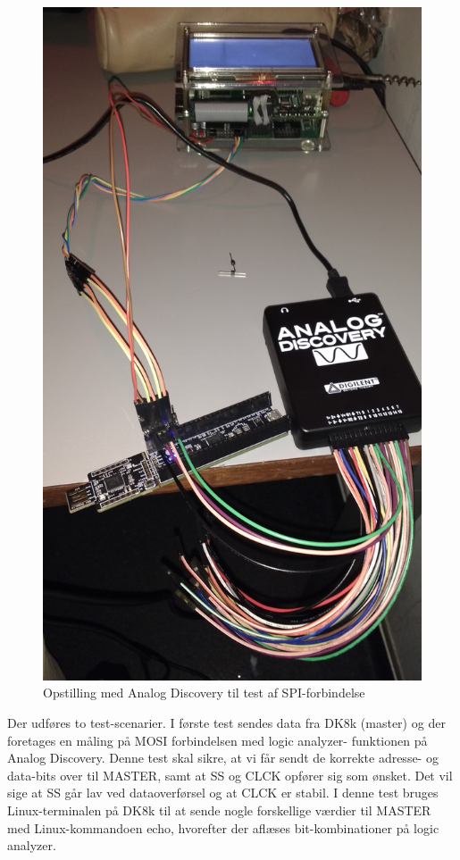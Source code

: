 \begin{figure}[H]
\includegraphics[scale=0.9]{Screenshots/Test_analog}
\caption{Opstilling med Analog Discovery til test af SPI-forbindelse} 
\end{figure}

Der udføres to test-scenarier. I første test sendes data fra DK8k (master) og der foretages en måling på MOSI forbindelsen med logic analyzer-
funktionen på Analog Discovery. Denne test skal sikre, at vi får sendt de korrekte adresse- og data-bits over til MASTER, samt at SS og CLCK opfører sig 
som ønsket. Det vil sige at SS går lav ved dataoverførsel og at CLCK er stabil. I denne test bruges Linux-terminalen på DK8k til at sende nogle forskellige
værdier til MASTER med Linux-kommandoen echo, hvorefter der aflæses bit-kombinationer på logic analyzer.

